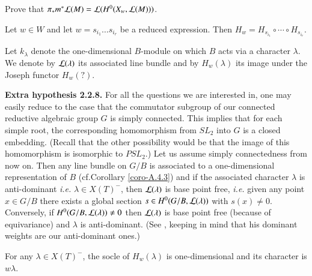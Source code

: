 \begin{exercise}\label{chap2-exer2.2.6}
Prove that $\pi_{\ast}m^{\ast}\mathcal{L}(M)=\mathcal{L}(H^{0}(X_{w},\mathcal{L}(M)))$. 
\end{exercise}

\begin{corollary}\label{chap2-coro2.2.7}
Let $w\in W$ and let $w=s_{i_{1}}\ldots s_{i_{r}}$ be a 
reduced expression. Then $H_{w}=H_{s_{i_{1}}}\circ\cdots\circ H_{s_{i_{r}}}$. 
\end{corollary}

Let $k_{\lambda}$ denote the one-dimensional $B$-module on which $B$
acts via a character $\lambda$. We denote by $\mathcal{L}(\lambda)$ its
associated line bundle and by $H_{w}(\lambda)$ its image under the
Joseph functor $H_{w}(?)$.

\medskip
\noindent
{\bf Extra hypothesis 2.2.8.} For all the questions we are interested
in, one may easily reduce to the case that the commutator subgroup of
our connected reductive algebraic group $G$ is simply
connected. This
implies that for each simple root, the corresponding homomorphism from
$SL_{2}$ into $G$ is a closed embedding. (Recall that the other
possibility would be that the image of this homomorphism is isomorphic
to $PSL_{2}$.) Let us assume simply connectedness from now on. Then
any line bundle on $G/B$ is associated to a one-dimensional
representation of $B$ (cf.\@ Corollary \ref{coro-A.4.3})  and if the associated
character $\lambda$ is anti-dominant 
{\em i.e.} $\lambda\in X(T)^{-}$,
then $\mathcal{L}(\lambda)$ is base point 
free, {\em i.e.} given any point
$x\in G/B$ there exists a global section $s\in H^{0}(G/B,\mathcal{L}(\lambda))$
with $s(x)\neq 0$. Conversely, if $H^{0}(G/B,\mathcal{L}(\lambda))\neq 0$ then
$\mathcal{L}(\lambda)$ is base point free (because of equivariance) and
$\lambda$ is anti-dominant. (See \cite[II 2.6]{key11}, keeping in mind
that his dominant weights are our anti-dominant ones.)

\setcounter{theorem}{8}
\begin{lemma}\label{chap2-lem2.2.9}
For any $\lambda\in X(T)^{-}$, the socle of $H_{w}(\lambda)$ is
one-dimensio\-nal and its character is $w\lambda$.
\end{lemma}

